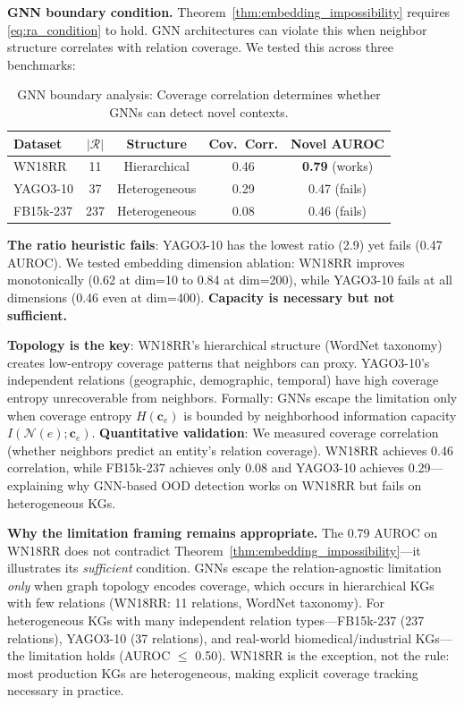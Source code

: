 \textbf{GNN boundary condition.}
Theorem~\ref{thm:embedding_impossibility} requires \eqref{eq:ra_condition} to hold. GNN architectures can violate this when neighbor structure correlates with relation coverage. We tested this across three benchmarks:

\begin{table}[ht]
\centering
\caption{GNN boundary analysis: Coverage correlation determines whether GNNs can detect novel contexts.}
\label{tab:gnn_boundary}
\small
\begin{tabular}{lcccc}
\toprule
Dataset & $|\mathcal{R}|$ & Structure & Cov.\ Corr. & Novel AUROC \\
\midrule
WN18RR & 11 & Hierarchical & 0.46 & \textbf{0.79} (works) \\
YAGO3-10 & 37 & Heterogeneous & 0.29 & 0.47 (fails) \\
FB15k-237 & 237 & Heterogeneous & 0.08 & 0.46 (fails) \\
\bottomrule
\end{tabular}
\end{table}

\textbf{The ratio heuristic fails}: YAGO3-10 has the lowest ratio (2.9) yet fails (0.47 AUROC). We tested embedding dimension ablation: WN18RR improves monotonically (0.62 at dim=10 to 0.84 at dim=200), while YAGO3-10 fails at all dimensions (0.46 even at dim=400). \textbf{Capacity is necessary but not sufficient.}

\textbf{Topology is the key}: WN18RR's hierarchical structure (WordNet taxonomy) creates low-entropy coverage patterns that neighbors can proxy. YAGO3-10's independent relations (geographic, demographic, temporal) have high coverage entropy unrecoverable from neighbors. Formally: GNNs escape the limitation only when coverage entropy $H(\mathbf{c}_e)$ is bounded by neighborhood information capacity $I(\mathcal{N}(e); \mathbf{c}_e)$. \textbf{Quantitative validation}: We measured coverage correlation (whether neighbors predict an entity's relation coverage). WN18RR achieves 0.46 correlation, while FB15k-237 achieves only 0.08 and YAGO3-10 achieves 0.29---explaining why GNN-based OOD detection works on WN18RR but fails on heterogeneous KGs.

\textbf{Why the limitation framing remains appropriate.} The 0.79 AUROC on WN18RR does not contradict Theorem~\ref{thm:embedding_impossibility}---it illustrates its \emph{sufficient} condition. GNNs escape the relation-agnostic limitation \emph{only} when graph topology encodes coverage, which occurs in hierarchical KGs with few relations (WN18RR: 11 relations, WordNet taxonomy). For heterogeneous KGs with many independent relation types---FB15k-237 (237 relations), YAGO3-10 (37 relations), and real-world biomedical/industrial KGs---the limitation holds (AUROC $\leq$ 0.50). WN18RR is the exception, not the rule: most production KGs are heterogeneous, making explicit coverage tracking necessary in practice.

